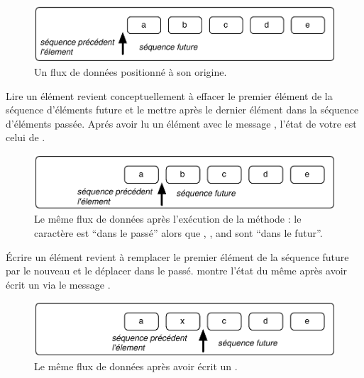 \documentclass[a4paper,10pt,twoside]{book}
\begin{document}
\begin{figure}[ht]
\centerline{\includegraphics[scale=0.5]{_abcdeStef}}
\caption{Un flux de donn\'ees positionn\'e \`a son origine.}
\label{fig:_abcde}
\vspace{.2in}
\end{figure}

Lire un \'el\'ement revient conceptuellement \`a effacer le premier \'el\'ement de la s\'equence d'\'el\'ements future et le mettre apr\`es le dernier \'el\'ement dans la s\'equence d'\'el\'ements pass\'ee.
Apr\'es avoir lu un \'el\'ement avec le message , l'\'etat de votre \stream est celui de .

\begin{figure}[ht]
\centerline{\includegraphics[scale=0.5]{a_bcdeStef}}
\caption{Le m\^eme flux de donn\'ees apr\`es l'ex\'ecution de la m\'ethode : le caract\`ere  est ``dans le pass\'e'' alors que , ,  and  sont ``dans le futur''.}
\label{fig:a_bcde}
\vspace{.2in}
\end{figure}

\'Ecrire un \'el\'ement revient \`a remplacer le premier \'el\'ement de la s\'equence future par le nouveau et le d\'eplacer dans le pass\'e.  montre l'\'etat du m\^eme \stream apr\`es avoir \'ecrit un  via le message  .

\begin{figure}[h!t]
\centerline{\includegraphics[scale=0.5]{ax_cdeStef}}
\caption{Le m\^eme flux de donn\'ees apr\`es avoir \'ecrit un .}
\label{fig:ax_cde}
\vspace{.2in}
\end{figure}
\end{document}
